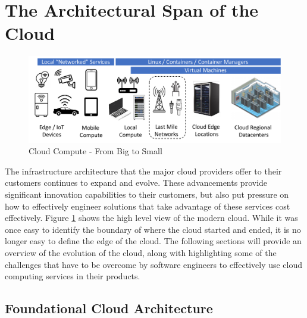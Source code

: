 \documentclass[conference]{IEEEconf}
\begin{document}
\section{The Architectural Span of the Cloud}
\label{sec:CloudArchitecture}

\begin{figure}[t!]
	\includegraphics[width=\textwidth]{images/CloudTopo2.pdf}	
	\caption{Cloud Compute - From Big to Small}
	\label{fig:CloudTopo}
\end{figure}

The infrastructure architecture that the major cloud providers offer to their customers continues to expand and evolve.  These advancements provide significant innovation capabilities to their customers, but also put pressure on how to effectively engineer solutions that take advantage of these services cost effectively.  Figure \ref{fig:CloudTopo} shows the high level view of the modern cloud.  While it was once easy to identify the boundary of where the cloud started and ended, it is no longer easy to define the edge of the cloud.  The following sections will provide an overview of the evolution of the cloud, along with highlighting some of the challenges that have to be overcome by software engineers to effectively use cloud computing services in their products.

\subsection{Foundational Cloud Architecture}
\end{document}
